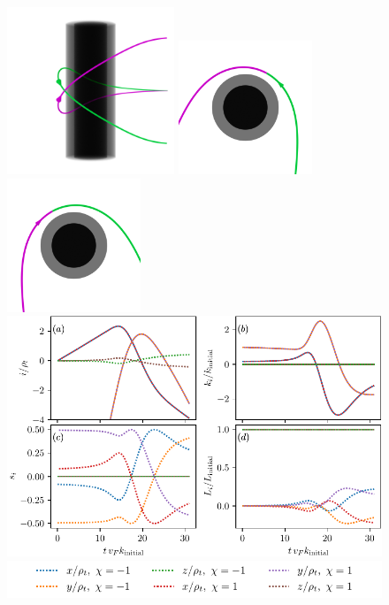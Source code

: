 \documentclass[submission, Phys]{SciPost}
\begin{document}
\begin{figure}[ht!]
    \centering
    \includegraphics[height=5cm,valign=c]{fig/lensing.png}
    \hfil
    \includegraphics[height=4cm,valign=c]{fig/lensing_ortho_1.png}
    \hfil
    \includegraphics[height=4cm,valign=c]{fig/lensing_ortho_2.png}
    \includegraphics{fig/lensing.pdf}
    \includegraphics{fig/lensing_legend.pdf}

\end{figure}
\end{document}
